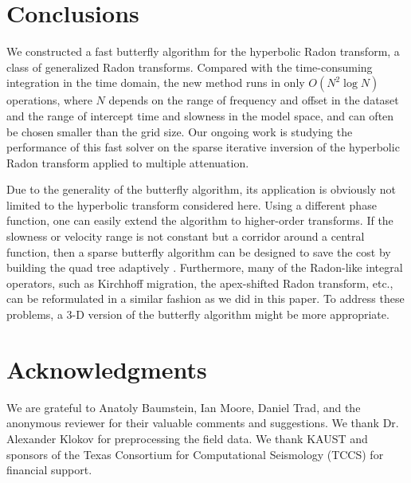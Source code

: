 


\section{Conclusions}

We constructed a fast butterfly algorithm for the hyperbolic Radon transform, a class of generalized Radon transforms. Compared with the time-consuming integration in the time domain, the new method runs in only $O(N^2\log N)$ operations, where $N$ depends on the range of frequency and offset in the dataset and the range of intercept time and slowness in the model space, and can often be chosen smaller than the grid size. Our ongoing work is studying the performance of this fast solver on the sparse iterative inversion of the hyperbolic Radon transform applied to multiple attenuation.

Due to the generality of the butterfly algorithm, its application is obviously not limited to the hyperbolic transform considered here. Using a different phase function, one can easily extend the algorithm to higher-order transforms. If the slowness or velocity range is not constant but a corridor around a central function, then a sparse butterfly algorithm can be designed to save the cost by building the quad tree adaptively \citep{Ying09}. Furthermore, many of the Radon-like integral operators, such as Kirchhoff migration, the apex-shifted Radon transform,  etc., can be reformulated in a similar fashion as we did in this paper. To address these problems, a 3-D version of the butterfly algorithm might be more appropriate.



\section{Acknowledgments}

We are grateful to  Anatoly Baumstein, Ian Moore, Daniel Trad, and the anonymous reviewer for their valuable comments and suggestions. We thank Dr. Alexander Klokov for preprocessing the field data. We thank KAUST and sponsors of the Texas Consortium for Computational Seismology (TCCS) for financial support. 



